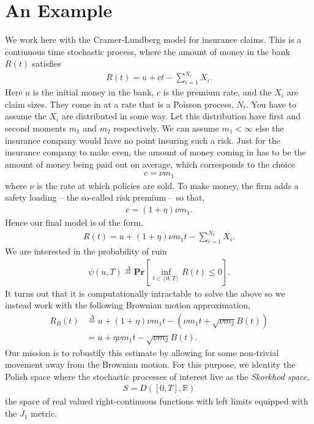 \documentclass[12pt]{article}
\newcommand{\R}{\mathbb{R}}
\renewcommand{\Pr}{\textbf{Pr}}
\newcommand{\define}{\overset{\Delta}{=}}
\theoremstyle{definition}
\theoremstyle{definition}
\theoremstyle{definition}
\begin{document}
\section*{An Example}
We work here with the Cramer-Lundberg model for insurance claims. This is a continuous time stochastic process, where the amount of money in the bank $R(t)$ satisfies
\begin{align*}
R(t)=u+ct-\sum_{i=1}^{N_t}X_i.
\end{align*}
Here $u$ is the initial money in the bank, $c$ is the premium rate, and the $X_i$ are claim sizes. They come in at a rate that is a Poisson process, $N_t$. You have to assume the $X_i$ are distributed in some way. Let this distribution have first and second moments $m_1$ and $m_2$ respectively. We can assume $m_1<\infty$ else the insurance company would have no point insuring such a risk. Just for the insurance company to make even, the amount of money coming in has to be the amount of money being paid out on average, which corresponds to the choice
\begin{align*}
c=\nu m_1
\end{align*}
where $\nu$ is the rate at which policies are sold. To make money, the firm adds a safety loading -- the so-called risk premium -- so that,
\begin{align*}
c=(1+\eta)\nu m_1.
\end{align*}
Hence our final model is of the form,
\begin{align*}
R(t)=u+(1+\eta)\nu m_1t-\sum_{i=1}^{N_t}X_i.
\end{align*}
We are interested in the probability of ruin
\begin{align*}
\psi(u,T)\define\Pr\left[\inf_{t\in[0,T]} R(t)\leq 0\right].
\end{align*}
It turns out that it is computationally intractable to solve the above so we instead work with the following Brownian motion approximation,
\begin{align*}
R_B(t)&\define u+(1+\eta)\nu m_1t - (\nu m_1t + \sqrt{\nu m_2}B(t))\\
&=u+\eta \nu m_1t-\sqrt{\nu m_2}B(t).
\end{align*}
Our mission is to robustify this estimate by allowing for some non-trivial movement away from the Brownian motion. For this purpose, we identity the Polish space where the stochastic processes of interest live as the \emph{Skorkhod space},
\begin{align*}
S=D([0,T],\R)
\end{align*}
the space of real valued right-continuous functions with left limits equipped with the $J_1$ metric. 
\end{document}
